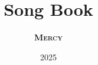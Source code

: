 \usepackage{array}
\usepackage[table,dvipsnames]{xcolor}
\usepackage{tabu}

\usepackage[chorded,noscripture]{songs}
\usepackage{lyluatex}

\usepackage{fontspec}
\usepackage{lilyglyphs}

\indexesoff

\renewcommand{\everychorus}{\textnote{Chorus:}}

\renewcommand{\lyricfont}{\sffamily\small}
\renewcommand{\printchord}[1]{\rmfamily\bf#1}


\title{Song Book}
\author{\textsc{\textbf{Mercy}}}
\date{2025}

